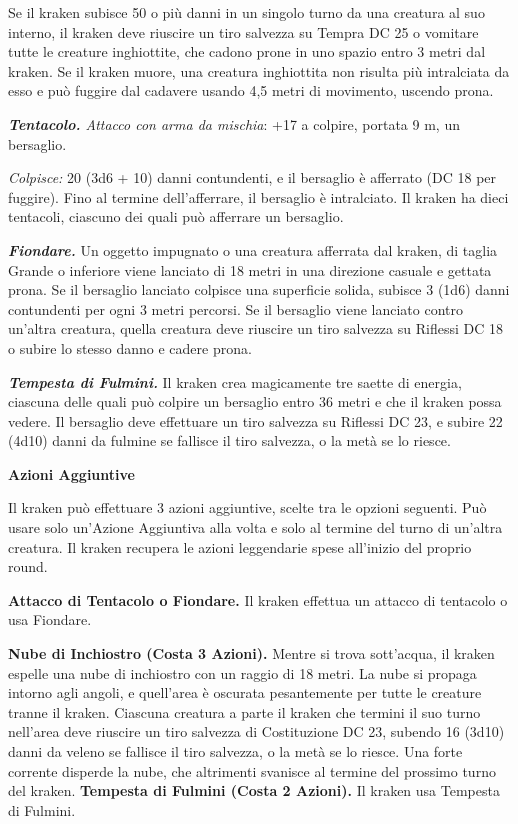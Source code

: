 \begin{multicols}{2}
Se il kraken subisce 50 o più danni in un singolo turno da una creatura
al suo interno, il kraken deve riuscire un tiro salvezza su Tempra
DC 25 o vomitare tutte le creature inghiottite, che cadono prone in uno
spazio entro 3 metri dal kraken. Se il kraken muore, una creatura
inghiottita non risulta più intralciata da esso e può fuggire dal
cadavere usando 4,5 metri di movimento, uscendo prona.

\emph{\textbf{Tentacolo.} Attacco con arma da mischia}: +17 a colpire,
portata 9 m, un bersaglio.

\emph{Colpisce:} 20 (3d6 + 10) danni contundenti, e il bersaglio è
afferrato (DC 18 per fuggire). Fino al termine dell'afferrare, il
bersaglio è intralciato. Il kraken ha dieci tentacoli, ciascuno dei
quali può afferrare un bersaglio.

\emph{\textbf{Fiondare.}} Un oggetto impugnato o una creatura afferrata
dal kraken, di taglia Grande o inferiore viene lanciato di 18 metri in
una direzione casuale e gettata prona. Se il bersaglio lanciato colpisce
una superficie solida, subisce 3 (1d6) danni contundenti per ogni 3
metri percorsi. Se il bersaglio viene lanciato contro un'altra creatura,
quella creatura deve riuscire un tiro salvezza su Riflessi DC 18 o
subire lo stesso danno e cadere prona.

\emph{\textbf{Tempesta di Fulmini.}} Il kraken crea magicamente tre
saette di energia, ciascuna delle quali può colpire un bersaglio entro
36 metri e che il kraken possa vedere. Il bersaglio deve effettuare un
tiro salvezza su Riflessi DC 23, e subire 22 (4d10) danni da fulmine se
fallisce il tiro salvezza, o la metà se lo riesce.

\textbf{Azioni Aggiuntive}

Il kraken può effettuare 3 azioni aggiuntive, scelte tra le opzioni
seguenti. Può usare solo un'Azione Aggiuntiva alla volta e solo al
termine del turno di un'altra creatura. Il kraken recupera le azioni
leggendarie spese all'inizio del proprio round.

\textbf{Attacco di Tentacolo o Fiondare.} Il kraken effettua un attacco
di tentacolo o usa Fiondare.

\textbf{Nube di Inchiostro (Costa 3 Azioni).} Mentre si trova
sott'acqua, il kraken espelle una nube di inchiostro con un raggio di 18
metri. La nube si propaga intorno agli angoli, e quell'area è oscurata
pesantemente per tutte le creature tranne il kraken. Ciascuna creatura a
parte il kraken che termini il suo turno nell'area deve riuscire un tiro
salvezza di Costituzione DC 23, subendo 16 (3d10) danni da veleno se
fallisce il tiro salvezza, o la metà se lo riesce. Una forte corrente
disperde la nube, che altrimenti svanisce al termine del prossimo turno
del kraken. \textbf{Tempesta di Fulmini (Costa 2 Azioni).} Il kraken usa
Tempesta di Fulmini.




\end{multicols}
